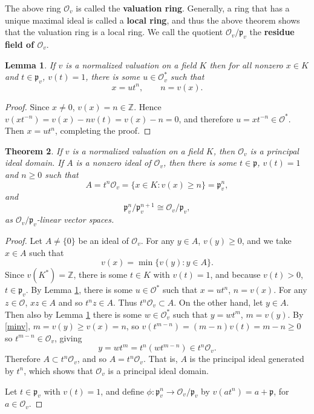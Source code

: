 \documentclass{article}
\theoremstyle{plain}
\newtheorem{theorem}{Theorem}
\newtheorem{lemma}[theorem]{Lemma}
\theoremstyle{definition}
\begin{document}
The above ring $\mathcal{O}_v$
is called the \textbf{valuation ring}. Generally, a ring that has a unique maximal ideal is called a \textbf{local ring}, and thus the above
theorem shows that the valuation ring is a local ring.
We call the quotient $\mathcal{O}_v / \mathfrak{p}_v$ the \textbf{residue field of $\mathcal{O}_v$}. 


\begin{lemma}
If $v$ is a normalized valuation on a field $K$ then for all nonzero $x \in K$
and $t \in \mathfrak{p}_v$, $v(t)=1$,
there is some $u \in \mathcal{O}_v^*$ such that
\[
x=ut^n, \qquad n = v(x).
\]
\label{utnlemma}
\end{lemma}
\begin{proof}
Since $x \neq 0$, $v(x) =n \in \mathbb{Z}$. 
Hence $v(xt^{-n})=v(x)-nv(t)=v(x)-n=0$, and therefore
$u=xt^{-n}  \in \mathcal{O}^*$. Then $x=ut^n$, completing the proof.
\end{proof}







\begin{theorem}
If $v$ is a normalized valuation on a field $K$, then $\mathcal{O}_v$ is a principal
ideal domain. If $A$ is a nonzero ideal of $\mathcal{O}_v$, then there is some
$t \in \mathfrak{p}$, $v(t)=1$ and $n \geq 0$ such that 
\[
A = t^n \mathcal{O}_v = \{x \in K: v(x) \geq n\}=\mathfrak{p}_v^n,
\]
and
\[
\mathfrak{p}_v^n/ \mathfrak{p}_v^{n+1} \cong \mathcal{O}_v / \mathfrak{p}_v,
\]
as $ \mathcal{O}_v / \mathfrak{p}_v$-linear vector spaces.
\end{theorem}
\begin{proof}
Let $A \neq \{0\}$ be an ideal of $\mathcal{O}_v$. For any $y \in A$, $v(y) \geq 0$, and we take
$x \in A$ such that
\begin{equation}
v(x) = \min\{v(y): y \in A\}.
\label{minv}
\end{equation}
Since
$v(K^*)=\mathbb{Z}$,  there is  some $t \in K$ with
$v(t)=1$, and because $v(t)>0$, $t \in \mathfrak{p}_v$. 
By Lemma \ref{utnlemma}, there is some $u \in \mathcal{O}^*$ such that
$x=ut^n$, $n=v(x)$. 
For any $z \in \mathcal{O}$, $xz \in A$ and so $t^nz \in A$. Thus $t^n \mathcal{O}_v \subset A$. 
On the other hand, let $y \in A$. Then also by Lemma \ref{utnlemma} there is some $w \in \mathcal{O}_v^*$
such that $y=wt^m$, $m=v(y)$. By \eqref{minv}, $m=v(y) \geq v(x) = n$, so $v(t^{m-n})=(m-n)v(t)=m-n \geq 0$
so $t^{m-n} \in \mathcal{O}_v$, giving
\[
y=wt^m = t^n (wt^{m-n})  \in t^n \mathcal{O}_v.
\]
Therefore $A \subset t^n\mathcal{O}_v$, and so $A=t^n \mathcal{O}_v$. That is, $A$ is the principal ideal generated by $t^n$,
which shows that $\mathcal{O}_v$ is a principal ideal domain. 

Let $t \in \mathfrak{p}_v$ with $v(t)=1$, and 
define $\phi:\mathfrak{p}_v^n \to \mathcal{O}_v / \mathfrak{p}_v$ by
$v(at^n) = a+\mathfrak{p}$, for $a \in \mathcal{O}_v$. 
\end{proof}
\end{document}
